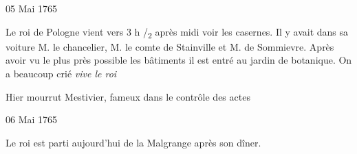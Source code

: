                      \begin{diary}{05 Mai 1765}{}


                           Le roi de Pologne vient vers 3 h /\textsubscript{2} après midi
                           voir les casernes. Il y avait dans sa
                           voiture
                           M. le chancelier, M. le comte de Stainville
                           et M. de Sommievre. Après
                           avoir vu le plus
                           près possible les bâtiments il est entré au
                           jardin de botanique. On a
                           beaucoup crié
                           \og \emph{vive le roi} \fg{}
                        \bigskip


                         Hier mourrut
                           Mestivier, fameux
                           dans le contrôle des actes \bigskip


                     \end{diary}
                     \begin{diary}{06 Mai 1765}{}


                           Le roi est parti aujourd'hui de
                              la Malgrange
                           après son dîner. \bigskip


                     \end{diary}

